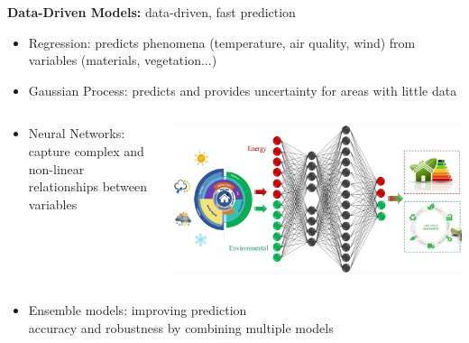 \documentclass{beamer}
\begin{document}
\begin{frame}
    \small
    \textbf{Data-Driven Models:} data-driven, fast prediction %
    \begin{itemize}
        \item Regression: predicts phenomena (temperature, air quality, wind) from variables (materials, vegetation...)
        \item Gaussian Process: predicts and provides uncertainty for areas with little data
    \end{itemize}
    \vspace{-0.3cm}
    \begin{columns}[T]
    \begin{column}{0.6\textwidth}
    \begin{itemize}
        \setlength\itemindent{0.3cm}
        \item Neural Networks: capture complex and non-linear relationships between variables 
        \end{itemize}
    \end{column}

    \begin{column}{0.4\textwidth}
        \vspace{-0.3cm}
        \includegraphics[width=1\textwidth]{images/NN-env.jpg}
    \end{column}
    \end{columns}
    \vspace{-0.3cm}
    \begin{itemize}
        \item Ensemble models: improving prediction \\ accuracy and robustness by combining multiple models
    \end{itemize}
\end{frame}
\end{document}
